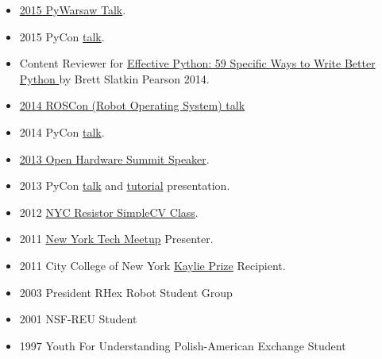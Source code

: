 \documentclass[10pt]{article}
\newenvironment{outerlist}[1][\enskip\textbullet]%
        {\begin{itemize}[#1]}{\end{itemize}%
         \vspace{-.6\baselineskip}}
\begin{document}
\begin{outerlist}
\item \href{http://summit.pywaw.org/2015/}{2015 PyWarsaw Talk}.
\item 2015 PyCon \href{https://www.youtube.com/watch?v=Wf0Uhebn2cM&ab_channel=PyCon2015}{talk}.
\item Content Reviewer for \href{http://smile.amazon.com/Effective-Python-Specific-Software-Development/dp/0134034287/ref=sr_1_1?ie=UTF8&qid=1453504025&sr=8-1&keywords=effective+python}{Effective Python: 59 Specific Ways to Write Better Python } by Brett Slatkin Pearson 2014.
\item \href{http://roscon.ros.org/2014/}{2014 ROSCon (Robot Operating System) talk}
\item 2014 PyCon \href{https://www.youtube.com/watch?v=grMfIoDgn9M&ab_channel=PyCon2014}{talk}.
\item \href{http://2013.oshwa.org/schedule/}{2013 Open Hardware Summit Speaker}.
\item 2013 PyCon \href{http://www.youtube.com/watch?v=UZSm7Q2bZoc&}{talk} and \href{http://www.youtube.com/watch?v=UZSm7Q2bZoc&}{tutorial} presentation.
\item 2012 \href{http://www.nycresistor.com/2012/02/29/tickets-still-available-for-this-amazing-new-class-this-sunday/}{NYC Resistor SimpleCV Class}.
\item 2011 \href{http://vimeo.com/28723189#t=4534}{New York Tech Meetup} Presenter.
\item 2011 City College of New York \href{http://entrepreneurship.ccny.cuny.edu/kaylieprize}{Kaylie Prize} Recipient.
\item 2003 President RHex Robot Student Group
\item 2001 NSF-REU Student
\item 1997 Youth For Understanding Polish-American Exchange Student
\end{outerlist}
\end{document}
